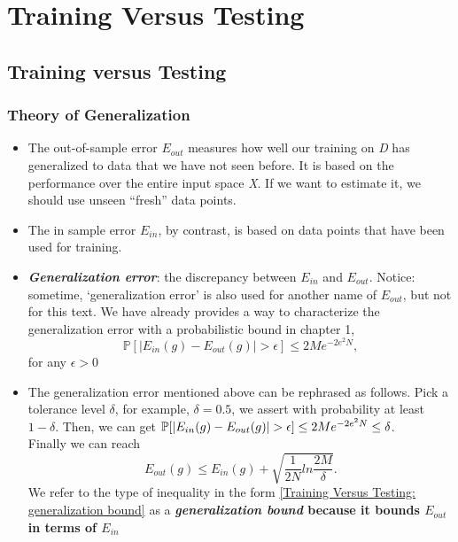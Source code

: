 \chapter{Training Versus Testing}

\section{Training versus Testing}
\subsection{Theory of Generalization}
\begin{itemize}[noitemsep, topsep=0pt]
    \item The out-of-sample error $E_{out}$ measures how well our training on \textit{D} has generalized to data that we have not seen before. It is based on the performance over the entire input space \textit{X}. If we want to estimate it, we should use unseen ``fresh'' data points.
    \item The in sample error $E_{in}$, by contrast, is based on data points that have been used for training.
    \item \textbf{\textit{Generalization error}}: the discrepancy between $E_{in}$ and $E_{out}$. Notice: sometime, `generalization error' is also used for another name of $E_{out}$, but not for this text. We have already provides a way to characterize the generalization error with a probabilistic bound in chapter 1,
        \begin{equation}
            \mathbb{P}[|E_{in}(g) - E_{out}(g)| > \epsilon] \leq 2Me^{-2e^2N},
        \end{equation}
        for any $\epsilon > 0$
    \item The generalization error mentioned above can be rephrased as follows.
        Pick a tolerance level $\delta$, for example, $\delta = 0.5$,
        we assert with probability at least $1 - \delta$.
        Then, we can get $\mathbb{P}[|E_{in}(g) - E_{out}(g)| > \epsilon] \le 2Me^{-2e^2N} \le \delta$.\\
        Finally we can reach
        \begin{equation} \label{Training Versus Testing: generalization bound}
            E_{out}(g) \le E_{in}(g) + \sqrt{\frac{1}{2N} ln \frac{2M}{\delta}}.
        \end{equation}
        We refer to the type of inequality in the form \ref{Training Versus Testing: generalization bound}
        as a \bf{\it{generalization bound}} because it bounds $E_{out}$ in terms of $E_{in}$

\end{itemize}

